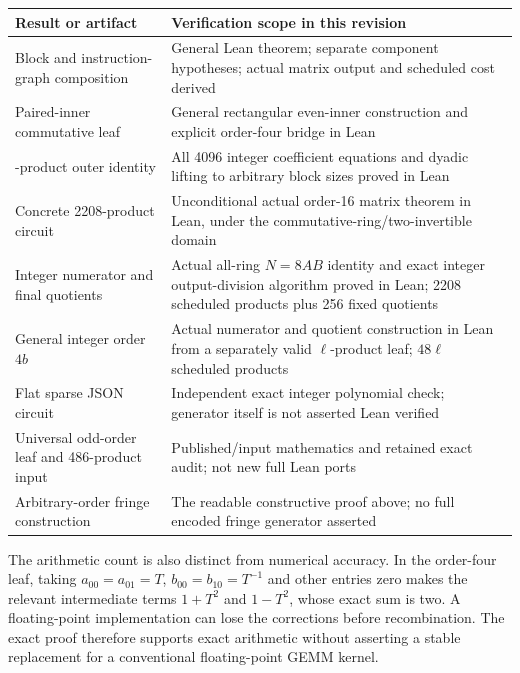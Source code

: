 \documentclass[
  11pt,
]{article}
\newcounter{none} %
\begin{document}
{\def\LTcaptype{none} %
\begin{longtable}[]{@{}
  >{\raggedright\arraybackslash}p{}
  >{\raggedright\arraybackslash}p{}@{}}
\toprule\noalign{}
\begin{minipage}[b]{\linewidth}\raggedright
Result or artifact
\end{minipage} & \begin{minipage}[b]{\linewidth}\raggedright
Verification scope in this revision
\end{minipage} \\
\midrule\noalign{}
\endhead
\bottomrule\noalign{}
\endlastfoot
Block and instruction-graph composition & General Lean theorem; separate
component hypotheses; actual matrix output and scheduled cost derived \\
Paired-inner commutative leaf & General rectangular even-inner
construction and explicit order-four bridge in Lean \\
48-product outer identity & All 4096 integer coefficient equations and
dyadic lifting to arbitrary block sizes proved in Lean \\
Concrete 2208-product circuit & Unconditional actual order-16 matrix
theorem in Lean, under the commutative-ring/two-invertible domain \\
Integer numerator and final quotients & Actual all-ring \(N=8AB\)
identity and exact integer output-division algorithm proved in Lean;
2208 scheduled products plus 256 fixed quotients \\
General integer order \(4b\) & Actual numerator and quotient
construction in Lean from a separately valid \(\ell\)-product leaf;
\(48\ell\) scheduled products \\
Flat sparse JSON circuit & Independent exact integer polynomial check;
generator itself is not asserted Lean verified \\
Universal odd-order leaf and 486-product input & Published/input
mathematics and retained exact audit; not new full Lean ports \\
Arbitrary-order fringe construction & The readable constructive proof
above; no full encoded fringe generator asserted \\
\end{longtable}
}

The arithmetic count is also distinct from numerical accuracy. In the
order-four leaf, taking \(a_{00}=a_{01}=T\), \(b_{00}=b_{10}=T^{-1}\)
and other entries zero makes the relevant intermediate terms \(1+T^2\)
and \(1-T^2\), whose exact sum is two. A floating-point implementation
can lose the corrections before recombination. The exact proof therefore
supports exact arithmetic without asserting a stable replacement for a
conventional floating-point GEMM kernel.
\end{document}

